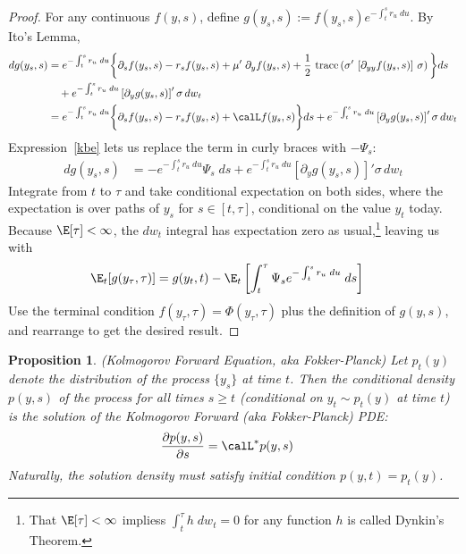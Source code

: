 \documentclass[12pt]{article}
\theoremstyle{plain}
\newtheorem{prop}[thm]{Proposition}
\theoremstyle{definition}
\theoremstyle{remark}
\newcommand{\trace}{\operatorname{trace}}
\begin{document}
\begin{proof}
For any continuous $f(y,s)$, define
$g(y_s,s):=f(y_s,s)e^{-\int_t^sr_u\;du}$.
By Ito's Lemma,
\begin{align*}
  dg(y_s,s)
  &=
  e^{-\int_t^sr_u\;du}\bigg\{
  \partial_s f(y_s,s)
  -r_s f(y_s,s)
  +
  \mu'\;
  \partial_yf(y_s,s)
  +
  \frac{1}{2}\,
  \trace\left(\sigma'\,
    \left[
    \partial_{yy}
    f(y_s,s)
    \right]
  \,\sigma\right)
  \bigg\}
  ds
  \\
  &\quad
  +
  e^{-\int_t^sr_u\;du}
  \left[
    \partial_yg(y_s,s)
  \right]'
  \sigma
  \,dw_t
  \\
  &=
  e^{-\int_t^sr_u\;du}\bigg\{
  \partial_s f(y_s,s)
  -r_s f(y_s,s)
  +
  \calL f(y_s,s)
  \bigg\}
  ds
  +
  e^{-\int_t^sr_u\;du}
  \left[
    \partial_yg(y_s,s)
  \right]'
  \sigma
  \,dw_t
\end{align*}
Expression~\ref{kbe} lets us replace the term in curly braces with
$-\Psi_s$:
\begin{align*}
  dg(y_s,s)
  &=
  -
  e^{-\int_t^sr_u\;du}
  \Psi_s
  \;
  ds
  +
  e^{-\int_t^sr_u\;du}
  \left[
    \partial_yg(y_s,s)
  \right]'
  \sigma
  \,dw_t
\end{align*}
Integrate from $t$ to $\tau$ and take conditional expectation on both
sides, where the expectation is over paths of $y_s$ for $s\in[t,\tau]$,
conditional on the value $y_t$ today.
Because $\E[\tau]<\infty$, the $dw_t$ integral has expectation zero as
usual,\footnote{%
  That $\E[\tau]<\infty$ impliess $\int_t^\tau h \;dw_t=0$ for any
  function $h$ is called Dynkin's Theorem.
}
leaving us with
\begin{align*}
  \E_t[g(y_{\tau},\tau)]
  &=
  g(y_t,t)
  -
  \E_t\left[
  \int_t^\tau
  \Psi_s
  e^{-\int_t^sr_u\;du}
  \;
  ds
  \right]
\end{align*}
Use the terminal condition $f(y_\tau,\tau)=\Phi(y_\tau,\tau)$ plus the
definition of $g(y,s)$, and rearrange to get the desired result.
\end{proof}


\clearpage
\begin{prop}\emph{(Kolmogorov Forward Equation, aka Fokker-Planck)}
Let $p_t(y)$ denote the distribution of the process $\{y_s\}$ at time
$t$. Then the conditional density $p(y,s)$ of the process for all times
$s\geq t$ (conditional on $y_t\sim p_t(y)$ at time $t$) is the solution
of the Kolmogorov Forward (aka Fokker-Planck) PDE:
\begin{align*}
  \frac{\partial p(y,s)}{\partial s}
  &=
  \calL^* p(y,s)
\end{align*}
Naturally, the solution density must satisfy initial condition
$p(y,t)=p_t(y)$.
\end{prop}
\end{document}
